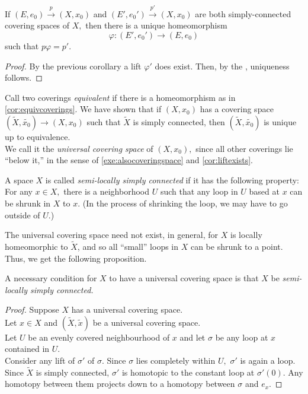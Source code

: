 \documentclass[12pt]{article}
\begin{document}
\begin{cor} \label{cor:equivcoverings}
	If $(E, e_0) \overset{p}{\longrightarrow} (X, x_0)$ and $(E', e_0') \overset{p'}{\longrightarrow} (X, x_0)$ are both simply-connected covering spaces of $X,$ then there is a unique homeomorphism
	\begin{equation*} 
		\varphi:(E', e_0') \to (E, e_0)
	\end{equation*}
	such that $p\varphi = p'.$
\end{cor}
\begin{proof} 
	By the previous corollary a lift $\varphi'$ does exist. Then, by the , uniqueness follows.
\end{proof}

\begin{defn}
	Call two coverings \emph{equivalent} if there is a homeomorphism as in \cref{cor:equivcoverings}. We have shown that if $(X, x_0)$ has a covering space $(\tilde{X}, \widetilde{x_0}) \to (X, x_0)$ such that $\tilde{X}$ is simply connected, then $(\tilde{X}, \widetilde{x_0})$ is unique up to equivalence.\\
	We call it the \emph{universal covering space} of $(X, x_0),$ since all other coverings lie ``below it,'' in the sense of \cref{exe:alsocoveringspace} and \cref{cor:liftexists}.
\end{defn}

\begin{defn}
	A space $X$ is called \emph{semi-locally simply connected} if it has the following property:\\
	For any $x \in X,$ there is a neighborhood $U$ such that any loop in $U$ based at $x$ can be shrunk in $X$ to $x.$ (In the process of shrinking the loop, we may have to go outside of $U.$)
\end{defn}

The universal covering space need not exist, in general, for $X$ is locally homeomorphic to $\tilde{X}$, and so all ``small'' loops in $X$ can be shrunk to a point. Thus, we get the following proposition. 
\begin{prop}
	A necessary condition for $X$ to have a universal covering space is that $X$ be \emph{semi-locally simply connected.}
\end{prop}
\begin{proof} 
	Suppose $X$ has a universal covering space.\\
	Let $x \in X$ and $(\tilde{X}, \tilde{x})$ be a universal covering space.\\
	Let $U$ be an evenly covered neighbourhood of $x$ and let $\sigma$ be any loop at $x$ contained in $U.$\\
	Consider any lift of $\sigma'$ of $\sigma.$ Since $\sigma$ lies completely within $U,$ $\sigma'$ is again a loop. Since $\tilde{X}$ is simply connected, $\sigma'$ is homotopic to the constant loop at $\sigma'(0).$ Any homotopy between them projects down to a homotopy between $\sigma$ and $e_x.$
\end{proof}
\end{document}
